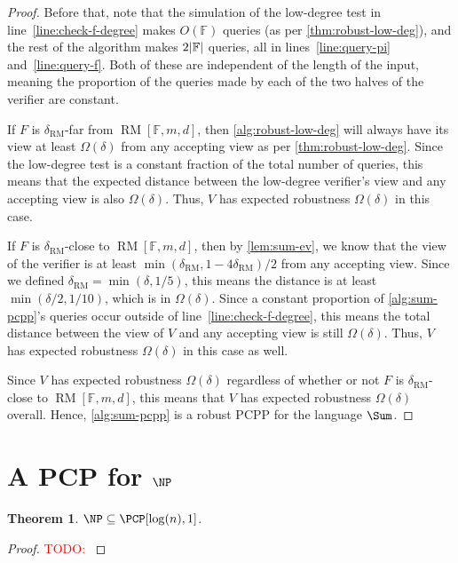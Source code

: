 \documentclass[english,12pt]{reedthesis}
\theoremstyle{plain}
\newtheorem{thm}{Theorem}[section]
\theoremstyle{definition}
\theoremstyle{remark}
\DeclareMathOperator{\RM}{RM}
\DeclarePairedDelimiter{\abs}{\lvert}{\rvert}
\newcommand{\TODO}[1]{\textcolor{red}{TODO: #1}}
\begin{document}
\begin{proof}
  Before that, note that the simulation of the low-degree test in
  line~\ref{line:check-f-degree} makes $O(\mathbb{F})$ queries (as per
  \cref{thm:robust-low-deg}), and the rest of the algorithm makes
  $2\abs{\mathbb{F}}$ queries, all in lines~\ref{line:query-pi}
  and~\ref{line:query-f}. Both of these are independent of the length of the
  input, meaning the proportion of the queries made by each of the two halves of
  the verifier are constant.

  If $F$ is $\delta_{\RM}$-far from $\RM[\mathbb{F}, m, d]$, then
  \cref{alg:robust-low-deg} will always have its view at least $\Omega(\delta)$ from any
  accepting view as per \cref{thm:robust-low-deg}. Since the low-degree test is
  a constant fraction of the total number of queries, this means that the
  expected distance between the low-degree verifier's view and any accepting
  view is also $\Omega(\delta)$. Thus, $V$ has expected robustness $\Omega(\delta)$ in this case.

  If $F$ is $\delta_{\RM}$-close to $\RM[\mathbb{F}, m, d]$, then by
  \cref{lem:sum-ev}, we know that the view of the verifier is at least
  $\min(\delta_{\RM}, 1 - 4\delta_{\RM})/2$ from any accepting view. Since we defined
  $\delta_{\RM} = \min(\delta, 1/5)$, this means the distance is at least
  $\min(\delta/2, 1/10)$, which is in $\Omega(\delta)$. Since a constant proportion of
  \cref{alg:sum-pcpp}'s queries occur outside of line~\ref{line:check-f-degree},
  this means the total distance between the view of $V$ and any accepting view
  is still $\Omega(\delta)$. Thus, $V$ has expected robustness $\Omega(\delta)$ in this case as well.

  Since $V$ has expected robustness $\Omega(\delta)$ regardless of whether or not $F$ is
  $\delta_{\RM}$-close to $\RM[\mathbb{F}, m, d]$, this means that $V$ has expected
  robustness $\Omega(\delta)$ overall. Hence, \cref{alg:sum-pcpp} is a robust PCPP for
  the language $\Sum$.
\end{proof}

\section{A PCP for $\NP$}

\begin{thm}
  $\NP \subseteq \PCP[\log(n), 1]$.
\end{thm}

\begin{proof}
  \TODO{}
\end{proof}
\end{document}
